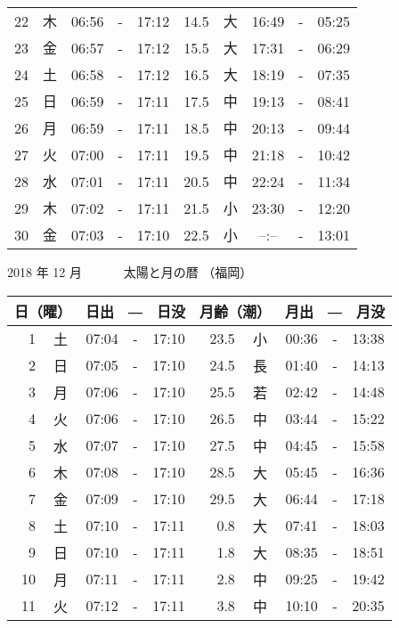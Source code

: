 \documentclass[a4j,10pt]{jsarticle}
\begin{document}
\begin{center}
\begin{table}[ht]
\begin{center}
\begin{tabular}{|rc|ccc|rc|ccc|}
 22 & 木 & 06:56 &-& 17:12 & 14.5 & 大 & 16:49 &-& 05:25 \\
 23 & 金 & 06:57 &-& 17:12 & 15.5 & 大 & 17:31 &-& 06:29 \\
 24 & 土 & 06:58 &-& 17:12 & 16.5 & 大 & 18:19 &-& 07:35 \\
 25 & 日 & 06:59 &-& 17:11 & 17.5 & 中 & 19:13 &-& 08:41 \\
 26 & 月 & 06:59 &-& 17:11 & 18.5 & 中 & 20:13 &-& 09:44 \\
 27 & 火 & 07:00 &-& 17:11 & 19.5 & 中 & 21:18 &-& 10:42 \\
 28 & 水 & 07:01 &-& 17:11 & 20.5 & 中 & 22:24 &-& 11:34 \\
 29 & 木 & 07:02 &-& 17:11 & 21.5 & 小 & 23:30 &-& 12:20 \\
 30 & 金 & 07:03 &-& 17:10 & 22.5 & 小 &  --:--  &-& 13:01 \\
    \hline
    \end{tabular}
    \end{center}
\end{table}
\newpage
  {\large 2018 年 12 月}
  {\Large 　　　太陽と月の暦   （福岡） }
  \begin{table}[ht]
  \begin{center}
     \begin{tabular}{|rc|ccc|rc|ccc|}
     \hline
     \multicolumn{2}{|c|}{日（曜）} & \multicolumn{3}{c|}{日出　―　日没} & \multicolumn{2}{c|}{月齢（潮）} & \multicolumn{3}{c|}{月出　―　月没}\\
     \hline
  1 & 土 & 07:04 &-& 17:10 & 23.5 & 小 & 00:36 &-& 13:38 \\
  2 & 日 & 07:05 &-& 17:10 & 24.5 & 長 & 01:40 &-& 14:13 \\
  3 & 月 & 07:06 &-& 17:10 & 25.5 & 若 & 02:42 &-& 14:48 \\
  4 & 火 & 07:06 &-& 17:10 & 26.5 & 中 & 03:44 &-& 15:22 \\
  5 & 水 & 07:07 &-& 17:10 & 27.5 & 中 & 04:45 &-& 15:58 \\
  6 & 木 & 07:08 &-& 17:10 & 28.5 & 大 & 05:45 &-& 16:36 \\
  7 & 金 & 07:09 &-& 17:10 & 29.5 & 大 & 06:44 &-& 17:18 \\
  8 & 土 & 07:10 &-& 17:11 &  0.8 & 大 & 07:41 &-& 18:03 \\
  9 & 日 & 07:10 &-& 17:11 &  1.8 & 大 & 08:35 &-& 18:51 \\
 10 & 月 & 07:11 &-& 17:11 &  2.8 & 中 & 09:25 &-& 19:42 \\
 11 & 火 & 07:12 &-& 17:11 &  3.8 & 中 & 10:10 &-& 20:35 \\

\end{tabular}
\end{center}
\end{table}
\end{center}
\end{document}
